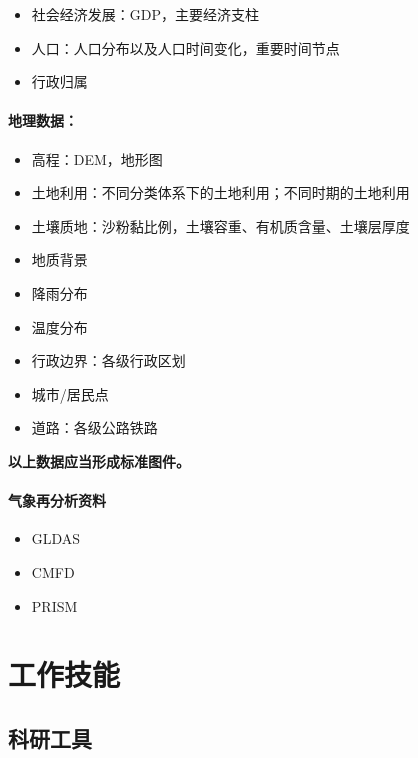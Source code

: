 \documentclass[
]{book}
\providecommand{\tightlist}{%
  \setlength{\itemsep}{0pt}\setlength{\parskip}{0pt}}
\begin{document}
\begin{itemize}
\tightlist
\item
  社会经济发展：GDP，主要经济支柱
\item
  人口：人口分布以及人口时间变化，重要时间节点
\item
  行政归属
\end{itemize}

\hypertarget{ux5730ux7406ux6570ux636e}{%
\subsubsection{地理数据：}\label{ux5730ux7406ux6570ux636e}}

\begin{itemize}
\tightlist
\item
  高程：DEM，地形图
\item
  土地利用：不同分类体系下的土地利用；不同时期的土地利用
\item
  土壤质地：沙粉黏比例，土壤容重、有机质含量、土壤层厚度
\item
  地质背景
\item
  降雨分布
\item
  温度分布
\item
  行政边界：各级行政区划
\item
  城市/居民点
\item
  道路：各级公路铁路
\end{itemize}

\textbf{以上数据应当形成标准图件。}

\hypertarget{ux6c14ux8c61ux518dux5206ux6790ux8d44ux6599}{%
\subsubsection{气象再分析资料}\label{ux6c14ux8c61ux518dux5206ux6790ux8d44ux6599}}

\begin{itemize}
\tightlist
\item
  GLDAS
\item
  CMFD
\item
  PRISM
\end{itemize}

\hypertarget{skill}{%
\chapter{工作技能}\label{skill}}

\hypertarget{researchtool}{%
\section{科研工具}\label{researchtool}}
\end{document}

